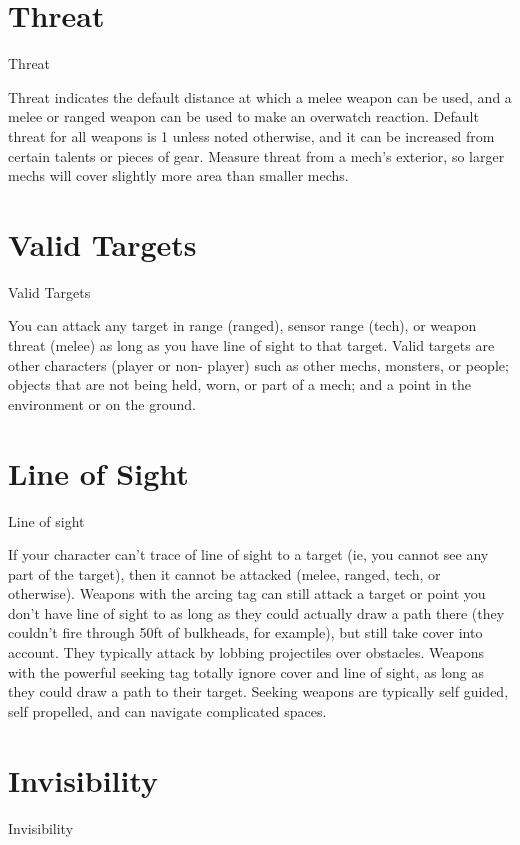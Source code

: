 \section{Threat}
                                                     Threat

Threat indicates the default distance at which a melee weapon can be used, and a melee or
ranged weapon can be used to make an overwatch reaction. Default threat for all weapons is 1
unless noted otherwise, and it can be increased from certain talents or pieces of gear. Measure
threat from a mech’s exterior, so larger mechs will cover slightly more area than smaller mechs.
\section{Valid Targets}
                                                Valid Targets

You can attack any target in range (ranged), sensor range (tech), or weapon threat (melee) as
long as you have line of sight to that target. Valid targets are other characters (player or non-
player) such as other mechs, monsters, or people; objects that are not being held, worn, or part of
a mech; and a point in the environment or on the ground.
\section{Line of Sight}
                                                Line of sight

If your character can’t trace of line of sight to a target (ie, you cannot see any part of the target),
then it cannot be attacked (melee, ranged, tech, or otherwise). Weapons with the arcing tag can
still attack a target or point you don’t have line of sight to as long as they could actually draw a
path there (they couldn’t fire through 50ft of bulkheads, for example), but still take cover into
account. They typically attack by lobbing projectiles over obstacles. Weapons with the powerful
seeking tag totally ignore cover and line of sight, as long as they could draw a path to their
target. Seeking weapons are typically self guided, self propelled, and can navigate complicated
spaces.



\section{Invisibility}

                                                 Invisibility

